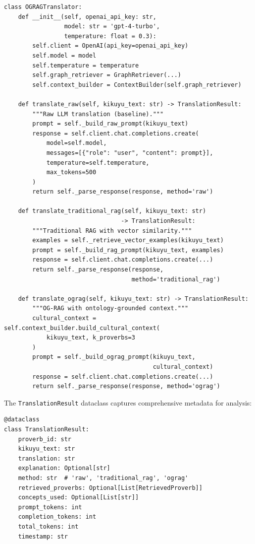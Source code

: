 \begin{verbatim}
class OGRAGTranslator:
    def __init__(self, openai_api_key: str, 
                 model: str = 'gpt-4-turbo',
                 temperature: float = 0.3):
        self.client = OpenAI(api_key=openai_api_key)
        self.model = model
        self.temperature = temperature
        self.graph_retriever = GraphRetriever(...)
        self.context_builder = ContextBuilder(self.graph_retriever)
    
    def translate_raw(self, kikuyu_text: str) -> TranslationResult:
        """Raw LLM translation (baseline)."""
        prompt = self._build_raw_prompt(kikuyu_text)
        response = self.client.chat.completions.create(
            model=self.model,
            messages=[{"role": "user", "content": prompt}],
            temperature=self.temperature,
            max_tokens=500
        )
        return self._parse_response(response, method='raw')
    
    def translate_traditional_rag(self, kikuyu_text: str) 
                                 -> TranslationResult:
        """Traditional RAG with vector similarity."""
        examples = self._retrieve_vector_examples(kikuyu_text)
        prompt = self._build_rag_prompt(kikuyu_text, examples)
        response = self.client.chat.completions.create(...)
        return self._parse_response(response, 
                                    method='traditional_rag')
    
    def translate_ograg(self, kikuyu_text: str) -> TranslationResult:
        """OG-RAG with ontology-grounded context."""
        cultural_context = self.context_builder.build_cultural_context(
            kikuyu_text, k_proverbs=3
        )
        prompt = self._build_ograg_prompt(kikuyu_text, 
                                          cultural_context)
        response = self.client.chat.completions.create(...)
        return self._parse_response(response, method='ograg')
\end{verbatim}

The \texttt{TranslationResult} dataclass captures comprehensive metadata for analysis:
\begin{verbatim}
@dataclass
class TranslationResult:
    proverb_id: str
    kikuyu_text: str
    translation: str
    explanation: Optional[str]
    method: str  # 'raw', 'traditional_rag', 'ograg'
    retrieved_proverbs: Optional[List[RetrievedProverb]]
    concepts_used: Optional[List[str]]
    prompt_tokens: int
    completion_tokens: int
    total_tokens: int
    timestamp: str
\end{verbatim}

